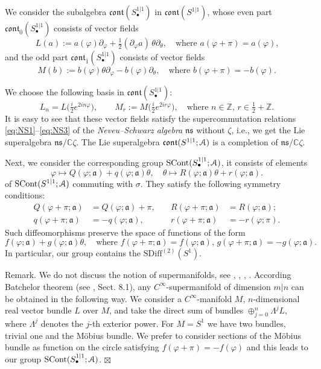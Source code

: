 \documentclass[]{amsart}
\newcounter{sec}
\def\phi{\varphi}
\def\cA{\EuScript A}
\def\fra{\mathfrak a}
\def\C {{\mathbb C }}
\def\Z{{\mathbb Z}}
\def\ov{\overline}
\def\sm{\smallskip}
\def\0{{\ov 0}}
\def\1{{\ov 1}}
\def\SDiff{\mathrm{SDiff}}
\def\SCont{\mathrm{SCont}}
\def\ns{\mathfrak{ns}}
\def\cont{\mathfrak{cont}}
\begin{document}
 We consider the subalgebra $\cont(S^{1|1}_\bullet)$
in $\cont(S^{1|1})$, whose even part $\cont_\0(S^{1|1}_\bullet)$
 consists of vector fields
\begin{equation}
L(a):=
a(\phi)\partial_\phi+\tfrac 12 (\partial_\phi a)\,\theta \partial_\theta,
\quad \text{where $a(\phi+\pi)=a(\phi)$,}
\label{eq:L(a)-sim}
\end{equation}
and the odd part $\cont_\1(S^{1|1}_\bullet)$ consists of vector fields
\begin{equation}
M(b):=
b(\phi) \theta \partial_\phi- b(\phi) \partial_\theta,
\quad \text{where $b(\phi+\pi)=-b(\phi)$.}
\label{eq:M(b)-sim}
\end{equation}


We choose the following basis  in $\cont(S^{1|1}_\bullet)$:
\begin{equation}
L_n=L\bigl(\tfrac i 2 e^{2in\phi} \bigr), \qquad M_r:=M\bigl(\tfrac i2 e^{2ir\phi} \bigr),\quad\text{where $n\in \Z$, $r\in \tfrac 12+\Z$.}
\label{eq:LMbasis}
\end{equation}
It is easy to see that these vector fields satisfy  the supercommutation relations \eqref{eq:NS1}--\eqref{eq:NS3} of the 
{\it Neveu--Schwarz
algebra} $\ns$ without $\zeta$,
i.e.,  we get the Lie superalgebra $\ns/\C\zeta$. The Lie superalgebra 
$\cont(S^{1|1};\cA)$ is a completion of $\ns/\C\zeta$.



\sm

Next, we  consider the corresponding group
$\SCont(S^{1|1}_\bullet;\cA)$, it consists
of elements
$$\phi\mapsto Q(\phi;\fra)+ q(\phi;\fra) \theta,
\quad
\theta\mapsto R(\phi;\fra)\theta+r(\phi;\fra).
$$
of
$\SCont(S^{1|1};\cA)$ commuting with $\sigma$.
They satisfy  the following symmetry conditions:
\begin{align}
 Q(\phi+\pi;\fra)&=Q(\phi;\fra)+\pi,& \quad   R(\phi+\pi;\fra)&=R(\phi;\fra);
 \\
q(\phi+\pi;\fra)&=-q(\phi;\fra),& \quad r(\phi+\pi;\fra)&=-r(\phi;\pi).
\end{align}
Such diffeomorphisms preserve the space of functions of the form
$$
f(\phi;\fra)+ g(\phi;\fra)\theta, \quad 
\text{where $f(\phi+\pi;\fra)=f(\phi;\fra)$, 
 $g(\phi+\pi;\fra)=-g(\phi;\fra)$.}
$$
In particular, our group contains the
$\SDiff^{(2)}(S^1)$.


\sm

{\sc Remark.}
We do not discuss the notion of supermanifolds,
see \cite{Lei}, \cite{Ber-super}, \cite{DeW}, \cite{Rog}.
According Batchelor theorem (see \cite{Rog}, Sect. 8.1), 
any $C^\infty$-supermanifold of dimension $m|n$ can be obtained in the following
way. We consider a $C^\infty$-manifold $M$, $n$-dimensional real vector bundle $L$
over  $M$, and take the direct sum of bundles $\oplus_{j=0}^n \Lambda^j L$,
where $\Lambda^j$ denotes the $j$-th exterior power.
For $M=S^1$ we have two bundles, trivial one and the M\"obius bundle.
We prefer to consider sections of the M\"obius bundle as
function on the circle satisfying $f(\phi+\pi)=-f(\phi)$
and this leads to our group $\SCont(S^{1|1}_\bullet;\cA)$.
\hfill $\boxtimes$  
\end{document}
